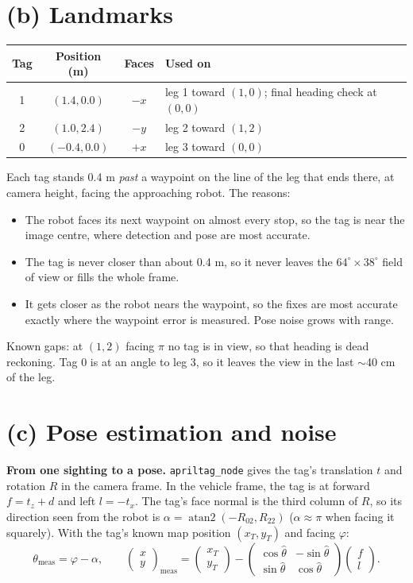 \documentclass[10pt]{article}
\begin{document}
\section*{(b) Landmarks}
\begin{center}
\small
\begin{tabular}{cccl}
\toprule
Tag & Position (m) & Faces & Used on \\
\midrule
1 & $(1.4, 0.0)$ & $-x$ & leg 1 toward $(1,0)$; final heading check at $(0,0)$ \\
2 & $(1.0, 2.4)$ & $-y$ & leg 2 toward $(1,2)$ \\
0 & $(-0.4, 0.0)$ & $+x$ & leg 3 toward $(0,0)$ \\
\bottomrule
\end{tabular}
\end{center}
Each tag stands 0.4 m \emph{past} a waypoint on the line of the leg that ends there, at camera height, facing the approaching robot. The reasons:
\begin{itemize}
  \item The robot faces its next waypoint on almost every stop, so the tag is near the image centre, where detection and pose are most accurate.
  \item The tag is never closer than about 0.4 m, so it never leaves the $64^\circ\times38^\circ$ field of view or fills the whole frame.
  \item It gets closer as the robot nears the waypoint, so the fixes are most accurate exactly where the waypoint error is measured. Pose noise grows with range.
\end{itemize}
Known gaps: at $(1,2)$ facing $\pi$ no tag is in view, so that heading is dead reckoning. Tag 0 is at an angle to leg 3, so it leaves the view in the last $\sim$40 cm of the leg.

\section*{(c) Pose estimation and noise}
\textbf{From one sighting to a pose.} \texttt{apriltag\_node} gives the tag's translation $t$ and rotation $R$ in the camera frame. In the vehicle frame, the tag is at forward $f = t_z + d$ and left $l = -t_x$. The tag's face normal is the third column of $R$, so its direction seen from the robot is $\alpha = \operatorname{atan2}(-R_{02}, R_{22})$ ($\alpha \approx \pi$ when facing it squarely). With the tag's known map position $(x_T, y_T)$ and facing $\varphi$:
\[
\theta_{\text{meas}} = \varphi - \alpha, \qquad
\begin{pmatrix} x \\ y \end{pmatrix}_{\text{meas}} =
\begin{pmatrix} x_T \\ y_T \end{pmatrix} -
\begin{pmatrix} \cos\hat\theta & -\sin\hat\theta \\ \sin\hat\theta & \cos\hat\theta \end{pmatrix}
\begin{pmatrix} f \\ l \end{pmatrix}.
\]
\end{document}
